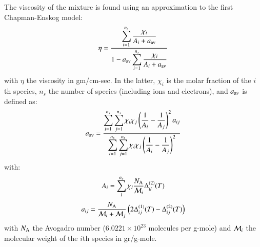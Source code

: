 \documentclass{warpdoc}
\newcommand{\mfd}{\displaystyle}
\begin{document}
The viscosity of the mixture is found using an approximation to the first Chapman-Enskog model:
%
\begin{equation}
    \eta=\frac{\mfd\sum_{i=1}^{n_s} \frac{\chi_i}{A_i+a_{\rm av}}}{\mfd 1- a_{\rm av}\sum_{i=1}^{n_s}\frac{\chi_i}{A_i + a_{\rm av}}}
\end{equation}
%
with $\eta$ the viscosity in gm/cm-sec. In the latter, $\chi_i$ is the molar fraction of the $i$th species, $n_s$ the number of species (including ions and electrons), and  $a_{\rm av}$ is defined as:
%
\begin{equation}
  a_{\rm av}=\frac{\mfd\sum_{i=1}^{n_s} \sum_{j=1}^{n_s} \chi_i \chi_j \left(\frac{1}{A_i}- \frac{1}{A_j} \right)^2 a_{ij}}{\mfd\sum_{i=1}^{n_s} \sum_{j=1}^{n_s} \chi_i \chi_j \left( \frac{1}{A_i} - \frac{1}{A_j}\right)^2}
\end{equation}
%
with:
%
\begin{equation}
    A_i= \sum_l^{n_s}  \chi_l \frac{N_{\rm A}}{{\cal M}_i} \Delta_{il}^{(2)}(T) 
\end{equation}
%
%
\begin{equation}
    a_{ij}=\frac{N_{\rm A}}{{\cal M}_i+{\cal M}_j}\left(2 \Delta_{ij}^{(1)}(T) - \Delta_{ij}^{(2)}(T) \right)
\end{equation}
%
with $N_{\rm A}$ the Avogadro number ($6.0221\times 10^{23}$ molecules per g-mole) and ${\cal M}_i$ the molecular weight of the $i$th species in gr/g-mole.
\end{document}

